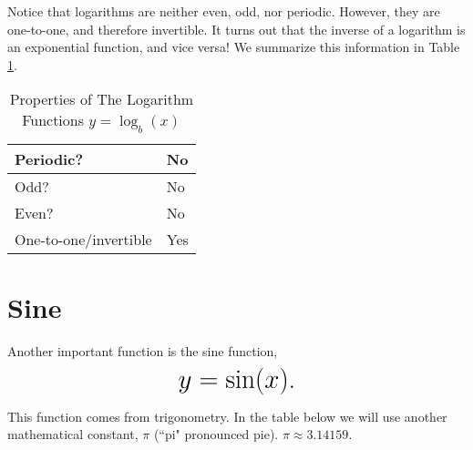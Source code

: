 \documentclass[nooutcomes]{ximera}
\begin{document}
Notice that logarithms are neither even, odd, nor periodic. However, they are one-to-one, and therefore invertible. It turns out that the inverse of a logarithm is an exponential function, and vice versa! We summarize this information in Table \ref{tab:logproperties}.

\begin{table}[h]
\caption{\label{tab:logproperties}Properties of The Logarithm Functions $y = \log_b(x)$}
\centering
\begin{tabular}{l|l}
Periodic? & No\\ \hline
Odd? &  No \\ \hline
Even? & No \\ \hline
One-to-one/invertible & Yes
\end{tabular}
\end{table}

\newpage


\section{Sine}
Another important function is the sine function, $$ \mbox{\huge $y=\sin(x)$.}$$ 


This function comes from trigonometry. In the table below we will use another mathematical constant, $\pi$ (``pi" pronounced pie). $\pi \approx 3.14159$.

\begin{image}
\end{image}
\end{document}
